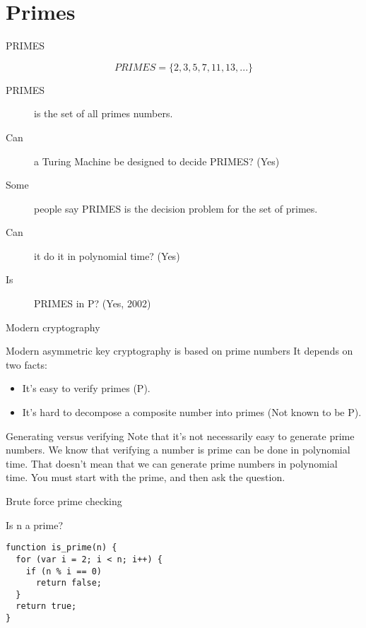 \documentclass{beamer}
\begin{document}
\section{Primes}

\begin{frame}{PRIMES}
  \begin{definition}
    $$ PRIMES = \{ 2, 3, 5, 7, 11, 13, ... \} $$
  \end{definition}
  \begin{description}
    \item[PRIMES] is the set of all primes numbers.
    \item[Can] a Turing Machine be designed to decide PRIMES? (Yes)
    \item[Some] people say PRIMES is the decision problem for the set of primes.
    \item[Can] it do it in polynomial time? (Yes)
    \item[Is] PRIMES in P? (Yes, 2002)
  \end{description}
\end{frame}

\begin{frame}{Modern cryptography}
  \begin{alertblock}{Modern asymmetric key cryptography is based on prime numbers}
    It depends on two facts:
    \begin{itemize}
      \item It's easy to verify primes (P).
      \item It's hard to decompose a composite number into primes (Not known to be P).
    \end{itemize}
  \end{alertblock}
  \begin{alertblock}{Generating versus verifying}
    Note that it's not necessarily easy to generate prime numbers.
    We know that verifying a number is prime can be done in polynomial time.
    That doesn't mean that we can generate prime numbers in polynomial time.
    You must start with the prime, and then ask the question.
  \end{alertblock}

\end{frame}

\begin{frame}[fragile]{Brute force prime checking}
  \begin{alertblock}{Is n a prime?}
    \begin{verbatim}
function is_prime(n) {
  for (var i = 2; i < n; i++) {
    if (n % i == 0)
      return false;
  }
  return true;
}
    \end{verbatim}
  \end{alertblock}
\end{frame}
\end{document}
